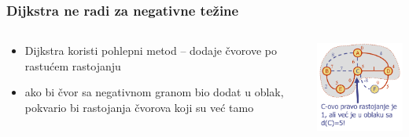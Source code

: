 \documentclass[compress,aspectratio=169]{beamer}
\begin{document}
\begin{frame}[fragile]
  \frametitle{Dijkstra ne radi za negativne težine}
  \begin{columns}
    \begin{column}[t]{7cm}
      \begin{itemize}
        \item Dijkstra koristi pohlepni metod -- dodaje čvorove po 
          rastućem rastojanju
        \item ako bi čvor sa negativnom granom bio dodat u oblak,
          pokvario bi rastojanja čvorova koji su već tamo
      \end{itemize}
    \end{column}
    \begin{column}[t]{5cm}
      \begin{center}
        \includegraphics[width=5cm]{asp-14-pic65.png}
      \end{center}
    \end{column}
  \end{columns}
\end{frame}
\end{document}
